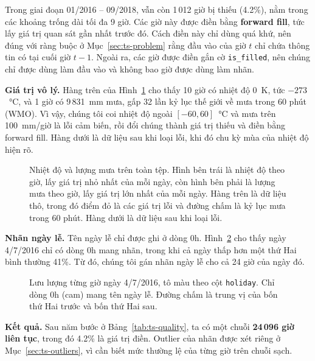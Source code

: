 Trong giai đoạn 01/2016 -- 09/2018, vẫn còn 1\,012 giờ bị thiếu (4.2\%), nằm trong các khoảng trống dài tối đa 9 giờ. Các giờ này được điền
bằng \textbf{forward fill}, tức lấy giá trị quan sát gần nhất trước đó. Cách điền này chỉ dùng quá khứ, nên đúng với ràng buộc ở
Mục~\ref{sec:ts-problem} rằng đầu vào của giờ $t$ chỉ chứa thông tin có tại cuối giờ $t-1$. Ngoài ra, các giờ được điền gắn cờ
\texttt{is\_filled}, nên chúng chỉ được dùng làm đầu vào và không bao giờ được dùng làm nhãn.

\textbf{Giá trị vô lý.} Hàng trên của Hình~\ref{fig:ts-invalid} cho thấy 10 giờ có nhiệt độ 0~K, tức $-273$~°C, và 1 giờ có 9\,831~mm mưa,
gấp 32 lần kỷ lục thế giới về mưa trong 60 phút (WMO). Vì vậy, chúng tôi coi nhiệt độ ngoài $[-60, 60]$~°C và mưa trên 100~mm/giờ là lỗi cảm
biến, rồi đổi chúng thành giá trị thiếu và điền bằng forward fill. Hàng dưới là dữ liệu sau khi loại lỗi, khi đó chu kỳ mùa của nhiệt độ hiện
rõ.

\begin{figure}[H]
\centering
{}
\caption{Nhiệt độ và lượng mưa trên toàn tệp. Hình bên trái là nhiệt độ theo giờ, lấy giá trị nhỏ nhất của mỗi ngày, còn hình bên phải là
lượng mưa theo giờ, lấy giá trị lớn nhất của mỗi ngày. Hàng trên là dữ liệu thô, trong đó điểm đỏ là các giá trị lỗi và đường chấm là kỷ lục
mưa trong 60 phút. Hàng dưới là dữ liệu sau khi loại lỗi.}
\label{fig:ts-invalid}
\end{figure}

\textbf{Nhãn ngày lễ.} Tên ngày lễ chỉ được ghi ở dòng 0h. Hình~\ref{fig:ts-holiday-label} cho thấy ngày 4/7/2016 chỉ có dòng 0h mang nhãn,
trong khi cả ngày thấp hơn một thứ Hai bình thường 41\%. Từ đó, chúng tôi gán nhãn ngày lễ cho cả 24 giờ của ngày đó.

\begin{figure}[H]
\centering
{}
\caption{Lưu lượng từng giờ ngày 4/7/2016, tô màu theo cột \texttt{holiday}. Chỉ dòng 0h (cam) mang tên ngày lễ. Đường chấm là trung vị
của bốn thứ Hai trước và bốn thứ Hai sau.}
\label{fig:ts-holiday-label}
\end{figure}

\textbf{Kết quả.} Sau năm bước ở Bảng~\ref{tab:ts-quality}, ta có một chuỗi \textbf{24\,096 giờ liên tục}, trong đó 4.2\% là giá trị điền.
Outlier của nhãn được xét riêng ở Mục~\ref{sec:ts-outliers}, vì cần biết mức thường lệ của từng giờ trên chuỗi sạch.

